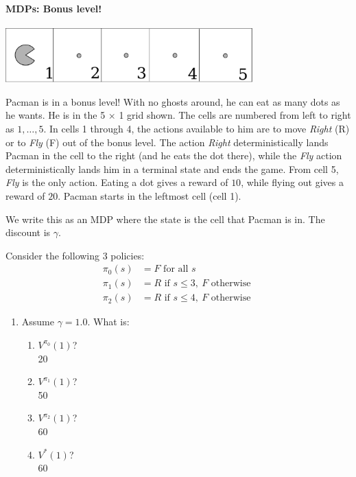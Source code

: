 \paragraph{MDPs: Bonus level!}
\begin{center}
\centering
\includegraphics[height=2.1cm]{figures/drawing2.pdf}
\vspace{1mm}
\end{center}

Pacman is in a bonus level! With no ghosts around, he can eat as many dots as he wants. He is in the 5 $\times$ 1 grid shown. The cells are numbered from left to right as $1,\ldots, 5$. In cells 1 through 4, the actions available to him are to move \emph{Right} (R) or to \emph{Fly} (F) out of the bonus level. The action \emph{Right} deterministically lands Pacman in the cell to the right (and he eats the dot there), while the \emph{Fly} action deterministically lands him in a terminal state and ends the game. From cell 5, \emph{Fly} is the only action.  Eating a dot gives a reward of $10$, while flying out gives a reward of $20$. Pacman starts in the leftmost cell (cell 1).

We write this as an MDP where the state is the cell that Pacman is in. The discount is $\gamma$.

Consider the following 3 policies:
\begin{align*}
\pi_0(s) &= F \textrm{ for all } s \\
\pi_1(s) &= R \textrm{ if }s \leq 3,\ F \textrm{ otherwise }\\
\pi_2(s) &= R \textrm{ if }s \leq 4,\ F \textrm{ otherwise }
\end{align*}

\begin{enumerate}


\item Assume $\gamma=1.0$. What is:
\vspace{10mm}
\begin{enumerate}
\item $V^{\pi_0}(1)$? \\
{\color{red}20}
\item $V^{\pi_1}(1)$? \\
{\color{red}50}
\item $V^{\pi_2}(1)$? \\
{\color{red}60}
\item $V^*(1)$? \\
{\color{red}60}
\end{enumerate}
\vfill

\end{enumerate}